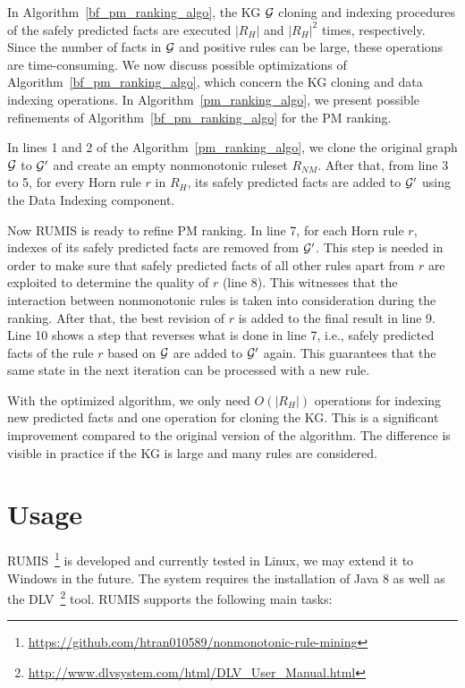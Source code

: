 In Algorithm~\ref{bf_pm_ranking_algo}, the KG $\mathcal{G}$ cloning and indexing procedures of the safely predicted facts are executed $|R_H|$ and $|R_H|^2$ times, respectively. Since the number of facts in $\mathcal{G}$ and positive rules can be large, these operations are time-consuming. We now discuss possible optimizations of Algorithm~\ref{bf_pm_ranking_algo}, which concern the KG cloning and data indexing operations. In Algorithm~\ref{pm_ranking_algo}, we present possible refinements of Algorithm~\ref{bf_pm_ranking_algo} for the PM ranking.

In lines 1 and 2 of the Algorithm~\ref{pm_ranking_algo}, we clone the original graph $\mathcal{G}$ to $\mathcal{G}'$ and create an empty nonmonotonic ruleset $R_{NM}$. After that, from line 3 to 5, for every Horn rule $r$ in $R_H$, its safely predicted facts are added to $\mathcal{G}'$ using the Data Indexing component.

Now RUMIS is ready to refine PM ranking. In line 7, for each Horn rule $r$, indexes of its safely predicted facts are removed from $\mathcal{G}'$. This step is needed in order to make sure that safely predicted facts of all other rules apart from $r$ are exploited to determine the quality of $r$ (line 8). This witnesses that the interaction between nonmonotonic rules is taken into consideration during the ranking. After that, the best revision of $r$ is added to the final result in line 9. Line 10 shows a step that reverses what is done in line 7, i.e., safely predicted facts of the rule $r$ based on $\mathcal{G}$ are added to $\mathcal{G}'$ again. This guarantees that the same state in the next iteration can be processed with a new rule.

With the optimized algorithm, we only need $O(|R_H|)$ operations for indexing new predicted facts and one operation for cloning the KG. This is a significant improvement compared to the original version of the algorithm. The difference is visible in practice if the KG is large and many rules are considered.

\section{Usage}

RUMIS~\footnote{\url{https://github.com/htran010589/nonmonotonic-rule-mining}} is developed and currently tested in Linux, we may extend it to Windows in the future. The system requires the installation of Java 8 as well as the DLV~\footnote{\url{http://www.dlvsystem.com/html/DLV_User_Manual.html}} tool. RUMIS supports the following main tasks:

